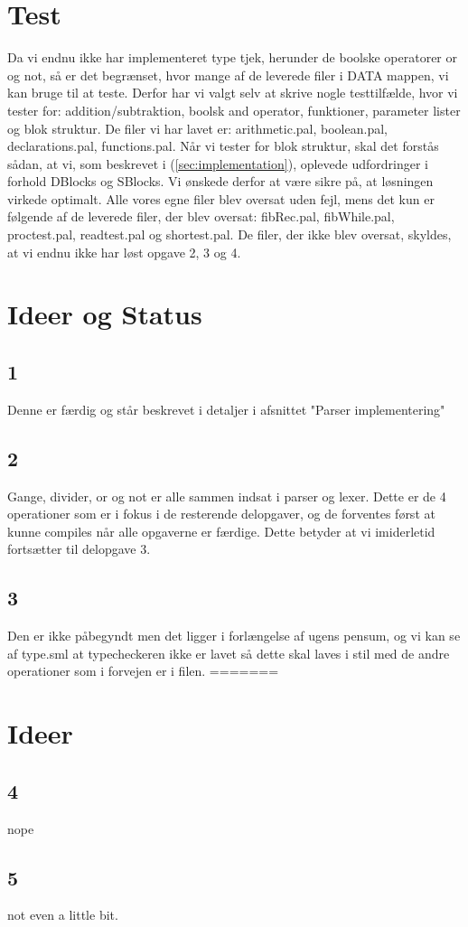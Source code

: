 \documentclass[11pt,a4paper]{article}
\begin{document}
\section*{Test}
Da vi endnu ikke har implementeret type tjek, herunder de boolske operatorer
or og not, så er det begrænset, hvor mange af de leverede filer i DATA mappen,
vi kan bruge til at teste. Derfor har vi valgt selv at skrive nogle testtilfælde,
hvor vi tester for: addition/subtraktion, boolsk and operator, funktioner,
parameter lister og blok struktur. De filer vi har lavet er: arithmetic.pal,
boolean.pal, declarations.pal, functions.pal. Når vi tester for blok struktur,
skal det forstås sådan, at vi, som beskrevet i (\ref{sec:implementation}), oplevede
udfordringer i forhold DBlocks og SBlocks. Vi ønskede derfor at være sikre på, at 
løsningen virkede optimalt. Alle vores egne filer blev oversat uden fejl, mens
det kun er følgende af de leverede filer, der blev oversat: fibRec.pal,
fibWhile.pal, proctest.pal, readtest.pal og shortest.pal. De filer, der ikke
blev oversat, skyldes, at vi endnu ikke har løst opgave 2, 3 og 4.

\section*{Ideer og Status}

\subsection{1}
Denne er færdig og står beskrevet i detaljer i afsnittet "Parser implementering"

\subsection{2}
Gange, divider, or og not er alle sammen indsat i parser og lexer. Dette er de 4 operationer som er i fokus i de resterende delopgaver, og de forventes først at kunne compiles når alle opgaverne er færdige.
Dette betyder at vi imiderletid fortsætter til delopgave 3.

\subsection{3}
Den er ikke påbegyndt men det ligger i forlængelse af ugens pensum, og vi kan se af type.sml at typecheckeren ikke er lavet så dette skal laves i stil med de andre operationer som i forvejen er i filen.
=======
\section*{Ideer}

\subsection{4}
nope
\subsection{5}
not even a little bit.
\end{document}
